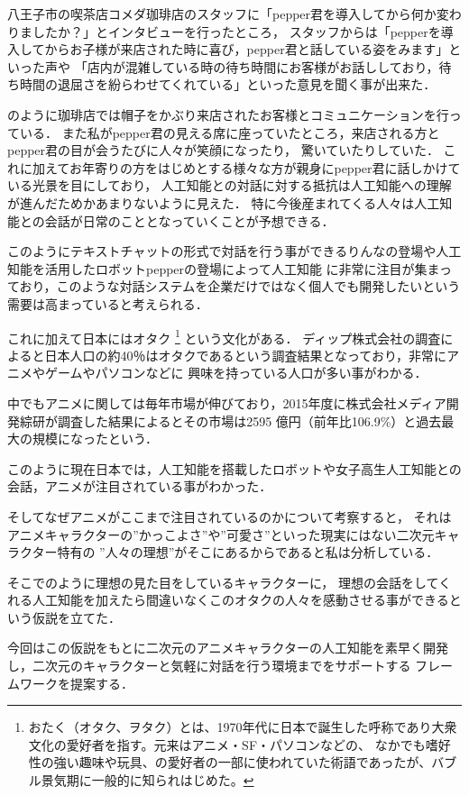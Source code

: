 八王子市の喫茶店コメダ珈琲店\cite{coffe}のスタッフに「pepper君を導入してから何か変わりましたか？」とインタビューを行ったところ，
スタッフからは「pepperを導入してからお子様が来店された時に喜び，pepper君と話している姿をみます」といった声や
「店内が混雑している時の待ち時間にお客様がお話ししており，待ち時間の退屈さを紛らわせてくれている」といった意見を聞く事が出来た．


のように珈琲店では帽子をかぶり来店されたお客様とコミュニケーションを行っている．
また私がpepper君の見える席に座っていたところ，来店される方とpepper君の目が会うたびに人々が笑顔になったり，
驚いていたりしていた．
これに加えてお年寄りの方をはじめとする様々な方が親身にpepper君に話しかけている光景を目にしており，
人工知能との対話に対する抵抗は人工知能への理解が進んだためかあまりないように見えた．
特に今後産まれてくる人々は人工知能との会話が日常のこととなっていくことが予想できる．

このようにテキストチャットの形式で対話を行う事ができるりんなの登場や人工知能を活用したロボットpepperの登場によって人工知能
に非常に注目が集まっており，このような対話システムを企業だけではなく個人でも開発したいという需要は高まっていると考えられる．

これに加えて日本にはオタク
\footnote{おたく（オタク、ヲタク）とは、1970年代に日本で誕生した呼称であり大衆文化の愛好者を指す。元来はアニメ・SF・パソコンなどの、
なかでも嗜好性の強い趣味や玩具、の愛好者の一部に使われていた術語であったが、バブル景気期に一般的に知られはじめた。\cite{ota}}
という文化がある．
ディップ株式会社の調査によると日本人口の約40％はオタクであるという調査結果となっており，非常にアニメやゲームやパソコンなどに
興味を持っている人口が多い事がわかる．

中でもアニメに関しては毎年市場が伸びており，2015年度に株式会社メディア開発綜研が調査した結果によるとその市場は2595
億円（前年比106.9\%）と過去最大の規模になったという．\cite{anime}

このように現在日本では，人工知能を搭載したロボットや女子高生人工知能との会話，アニメが注目されている事がわかった．

そしてなぜアニメがここまで注目されているのかについて考察すると，
それはアニメキャラクターの”かっこよさ”や”可愛さ”といった現実にはない二次元キャラクター特有の
”人々の理想”がそこにあるからであると私は分析している．


そこでのように理想の見た目をしているキャラクターに，
理想の会話をしてくれる人工知能を加えたら間違いなくこのオタクの人々を感動させる事ができるという仮説を立てた．

今回はこの仮説をもとに二次元のアニメキャラクターの人工知能を素早く開発し，二次元のキャラクターと気軽に対話を行う環境までをサポートする
フレームワークを提案する．

